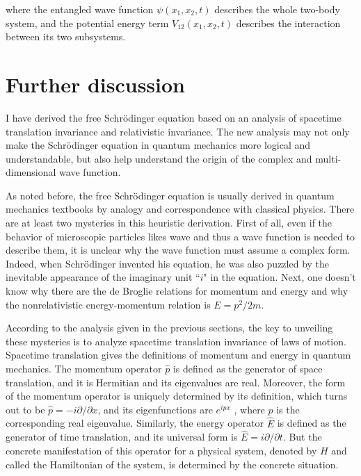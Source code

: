 \noindent where the entangled wave function $\psi(x_1,x_2,t)$ describes the whole two-body system, and the potential energy term $V_{12}(x_1,x_2,t)$ describes the interaction between its two subsystems. 

\section{Further discussion}

I have derived the free Schr\"{o}dinger equation based on an analysis of spacetime translation invariance and relativistic invariance. The new analysis may not only make the Schr\"{o}dinger equation in quantum mechanics more logical and understandable, but also help understand the origin of the complex and multi-dimensional wave function.

As noted before, the free Schr\"{o}dinger equation is usually derived in quantum mechanics textbooks by analogy and correspondence with classical physics.
There are at least two mysteries in this heuristic derivation. First of all, even if the behavior of microscopic particles likes wave and thus a wave function is needed to describe them, it is unclear why the wave function must assume a complex form. Indeed, when Schr\"{o}dinger invented his equation, he was also puzzled by the inevitable appearance of the imaginary unit ``$i$"  in the equation. Next, one doesn't know why there are the de Broglie relations for momentum and energy and why the nonrelativistic energy-momentum relation is $E=p^2/2m$.

According to the analysis given in the previous sections, the key to unveiling these mysteries is to analyze spacetime translation invariance of laws of motion. Spacetime translation gives the definitions of momentum and energy in quantum mechanics. The momentum operator $\hat{p}$ is defined as the generator of space translation, and it is Hermitian and its eigenvalues are real. Moreover, the form of the momentum operator is uniquely determined by its definition, which turns out to be $\hat{p}=-i{ \partial / \partial x}$, and its eigenfunctions are $e^{ipx}$ , where $p$ is the corresponding real eigenvalue. Similarly, the energy operator $\hat{E}$ is defined as the generator of time translation, and its universal form is $\hat{E}=i{\partial /\partial t}$. But the concrete manifestation of this operator for a physical system, denoted by $H$ and called the Hamiltonian of the system, is determined by the concrete situation. 

